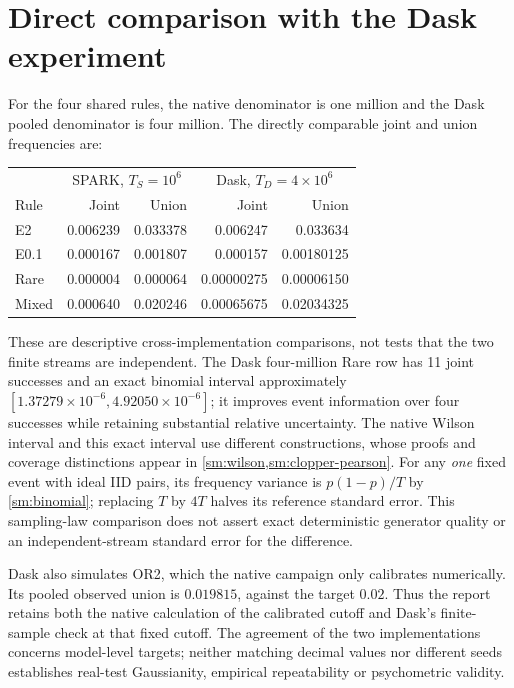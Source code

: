 \section{Direct comparison with the Dask experiment}

For the four shared rules, the native denominator is one million and the
Dask pooled denominator is four million. The directly comparable joint and
union frequencies are:
\begin{center}\small
\begin{tabular}{lrrrr}
\toprule
 & \multicolumn{2}{c}{SPARK, \(T_S=10^6\)}
 & \multicolumn{2}{c}{Dask, \(T_D=4\times10^6\)}\\
Rule & Joint & Union & Joint & Union\\
\midrule
E2    & 0.006239 & 0.033378 & 0.006247   & 0.033634\\
E0.1  & 0.000167 & 0.001807 & 0.000157   & 0.00180125\\
Rare  & 0.000004 & 0.000064 & 0.00000275 & 0.00006150\\
Mixed & 0.000640 & 0.020246 & 0.00065675 & 0.02034325\\
\bottomrule
\end{tabular}
\end{center}
These are descriptive cross-implementation comparisons, not tests that the
two finite streams are independent. The Dask four-million Rare row has 11
joint successes and an exact binomial interval approximately
\([1.37279\times10^{-6},4.92050\times10^{-6}]\); it improves event
information over four successes while retaining substantial relative
uncertainty. The native Wilson interval and this exact interval use different
constructions, whose proofs and coverage distinctions appear in
\cref{sm:wilson,sm:clopper-pearson}. For any \emph{one} fixed event with
ideal IID pairs, its frequency variance is \(p(1-p)/T\) by
\cref{sm:binomial}; replacing \(T\) by \(4T\) halves its reference standard
error. This sampling-law comparison does not assert exact deterministic
generator quality or an independent-stream standard error for the difference.

Dask also simulates OR2, which the native campaign only calibrates
numerically. Its pooled observed union is \(0.019815\), against the target
\(0.02\). Thus the report retains both the native calculation of the
calibrated cutoff and Dask's finite-sample check at that fixed cutoff.
The agreement of the two implementations concerns model-level targets;
neither matching decimal values nor different seeds establishes real-test
Gaussianity, empirical repeatability or psychometric validity.

